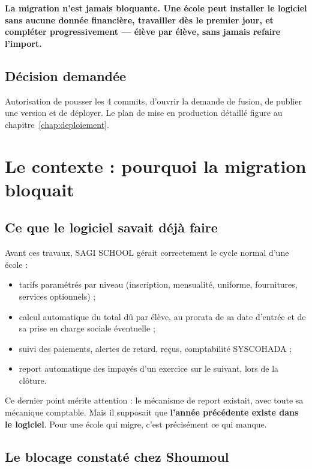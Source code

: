\documentclass[11pt,a4paper]{report}
\newcommand{\encadre}[2]{%
  \begingroup
  \setlength{\fboxsep}{9pt}%
  \noindent\colorbox{sagibg}{%
    \begin{minipage}{\dimexpr\linewidth-2\fboxsep\relax}
    \textbf{\color{#1}#2}
    \end{minipage}}%
  \par\vspace{8pt}
  \endgroup}
\newcommand{\pointcle}[1]{\encadre{sagiteal}{#1}}
\begin{document}
\pointcle{La migration n'est jamais bloquante. Une école peut installer le
logiciel sans aucune donnée financière, travailler dès le premier jour, et
compléter progressivement --- élève par élève, sans jamais refaire l'import.}

\section*{Décision demandée}

Autorisation de pousser les 4 commits, d'ouvrir la demande de fusion, de
publier une version et de déployer. Le plan de mise en production détaillé
figure au chapitre~\ref{chap:deploiement}.

\newpage

\chapter{Le contexte : pourquoi la migration bloquait}

\section{Ce que le logiciel savait déjà faire}

Avant ces travaux, SAGI SCHOOL gérait correctement le cycle normal d'une
école :

\begin{itemize}
\item tarifs paramétrés par niveau (inscription, mensualité, uniforme,
      fournitures, services optionnels) ;
\item calcul automatique du total dû par élève, au prorata de sa date
      d'entrée et de sa prise en charge sociale éventuelle ;
\item suivi des paiements, alertes de retard, reçus, comptabilité SYSCOHADA ;
\item report automatique des impayés d'un exercice sur le suivant, lors de la
      clôture.
\end{itemize}

Ce dernier point mérite attention : le mécanisme de report existait, avec toute
sa mécanique comptable. Mais il supposait que \textbf{l'année précédente existe
dans le logiciel}. Pour une école qui migre, c'est précisément ce qui manque.

\section{Le blocage constaté chez Shoumoul}
\end{document}
